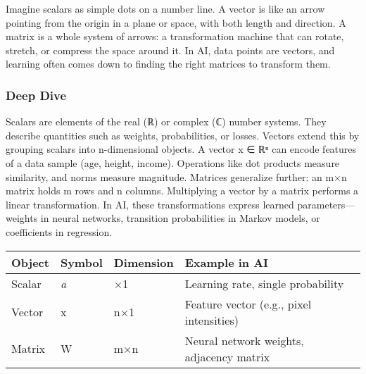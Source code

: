 \documentclass[
  letterpaper,
  DIV=11,
  numbers=noendperiod]{scrreprt}
\begin{document}
Imagine scalars as simple dots on a number line. A vector is like an
arrow pointing from the origin in a plane or space, with both length and
direction. A matrix is a whole system of arrows: a transformation
machine that can rotate, stretch, or compress the space around it. In
AI, data points are vectors, and learning often comes down to finding
the right matrices to transform them.

\subsubsection{Deep Dive}\label{deep-dive-100}

Scalars are elements of the real (ℝ) or complex (ℂ) number systems. They
describe quantities such as weights, probabilities, or losses. Vectors
extend this by grouping scalars into n-dimensional objects. A vector x ∈
ℝⁿ can encode features of a data sample (age, height, income).
Operations like dot products measure similarity, and norms measure
magnitude. Matrices generalize further: an m×n matrix holds m rows and n
columns. Multiplying a vector by a matrix performs a linear
transformation. In AI, these transformations express learned
parameters---weights in neural networks, transition probabilities in
Markov models, or coefficients in regression.

\begin{longtable}[]{@{}
  >{\raggedright\arraybackslash}p{}
  >{\raggedright\arraybackslash}p{}
  >{\raggedright\arraybackslash}p{}
  >{\raggedright\arraybackslash}p{}@{}}
\toprule\noalign{}
\begin{minipage}[b]{\linewidth}\raggedright
Object
\end{minipage} & \begin{minipage}[b]{\linewidth}\raggedright
Symbol
\end{minipage} & \begin{minipage}[b]{\linewidth}\raggedright
Dimension
\end{minipage} & \begin{minipage}[b]{\linewidth}\raggedright
Example in AI
\end{minipage} \\
\midrule\noalign{}
\endhead
\bottomrule\noalign{}
\endlastfoot
Scalar & \emph{a} & 1×1 & Learning rate, single probability \\
Vector & x & n×1 & Feature vector (e.g., pixel intensities) \\
Matrix & W & m×n & Neural network weights, adjacency matrix \\
\end{longtable}
\end{document}
